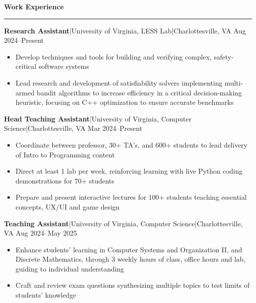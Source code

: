 \documentclass[11pt,letterpaper]{article}
\newcommand{\horibar}[2]{#1\hspace{5pt}|\hspace{5pt}#2}
\newcommand{\sep}[1]{\par\vspace{#1}}
\renewenvironment{section}[1]{
\sep{11pt}
{
\fontsize{14}{2}
\selectfont
\textbf{#1}\\[0.5pt]
}
\sep{6pt}
\noindent\rule{\linewidth}{0.5pt}
\sep{4pt}
}
{
}
\renewenvironment{subsection}[3]
{
\sep{4pt}
\horibar{\textbf{#1}}{#2} \hfill #3
\par\setstretch{1}
\begin{itemize}
}
{
\end{itemize}
\setstretch{0}
}
\begin{document}
\begin{section}{Work Experience}
    \begin{subsection}{Research Assistant}{\horibar{University of Virginia, LESS Lab}{Charlottesville, VA}}{Aug 2024–Present}
        \item Develop techniques and tools for building and verifying complex, safety-critical software systems 
        \item Lead research and development of satisfiability solvers implementing multi-armed bandit algorithms to increase efficiency in a critical decision-making heuristic, focusing on C++ optimization to ensure accurate benchmarks
    \end{subsection}
    \begin{subsection}{Head Teaching Assistant}{\horibar{University of Virginia, Computer Science}{Charlottesville, VA}}{Mar 2024–Present}
        \item Coordinate between professor, 30+ TA's, and 600+ students to lead delivery of Intro to Programming content
        \item Direct at least 1 lab per week, reinforcing learning with live Python coding demonstrations for 70+ students
        \item Prepare and present interactive lectures for 100+ students teaching essential concepts, UX/UI and game design
    \end{subsection}
    \begin{subsection}{Teaching Assistant}{\horibar{University of Virginia, Computer Science}{Charlottesville, VA}}{Aug 2024–May 2025}
        \item Enhance students’ learning in Computer Systems and Organization II, and Discrete Mathematics, through 3 weekly hours of class, office hours and lab, guiding to individual understanding
        \item Craft and review exam questions synthesizing multiple topics to test limits of students’ knowledge
    \end{subsection}
\end{section}
\end{document}
